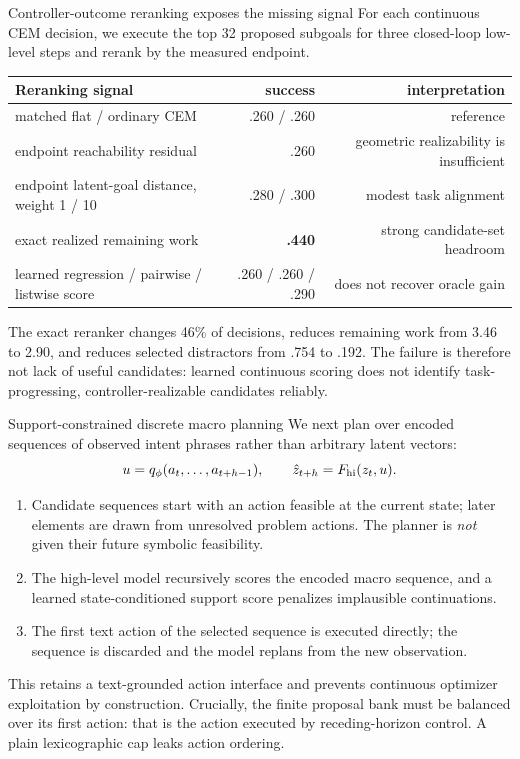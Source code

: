 \documentclass[aspectratio=169,10pt]{beamer}
\newcommand{\good}[1]{\textcolor{cgreen}{\textbf{#1}}}
\begin{document}
\begin{frame}{Controller-outcome reranking exposes the missing signal}
\footnotesize
For each continuous CEM decision, we execute the top 32 proposed subgoals for
three closed-loop low-level steps and rerank by the measured endpoint.

\medskip
\centering
\begin{tabular}{lrr}
\toprule
Reranking signal & success & interpretation\\
\midrule
matched flat / ordinary CEM & .260 / .260 & reference\\
endpoint reachability residual & .260 & geometric realizability is insufficient\\
endpoint latent-goal distance, weight 1 / 10 & .280 / .300 & modest task alignment\\
exact realized remaining work & \good{.440} & strong candidate-set headroom\\
\midrule
learned regression / pairwise / listwise score & .260 / .260 / .290 & does not recover oracle gain\\
\bottomrule
\end{tabular}

\medskip
The exact reranker changes 46\% of decisions, reduces remaining work from
3.46 to 2.90, and reduces selected distractors from .754 to .192. The failure
is therefore not lack of useful candidates: learned continuous scoring does
not identify task-progressing, controller-realizable candidates reliably.
\end{frame}

\begin{frame}{Support-constrained discrete macro planning}
\small
We next plan over encoded sequences of observed intent phrases rather than
arbitrary latent vectors:
\[
u=q_\phi(a_t,\ldots,a_{t+h-1}),\qquad
\hat z_{t+h}=F_{\rm hi}(z_t,u).
\]

\begin{enumerate}\itemsep3pt
\item Candidate sequences start with an action feasible at the current state;
later elements are drawn from unresolved problem actions. The planner is
\emph{not} given their future symbolic feasibility.
\item The high-level model recursively scores the encoded macro sequence, and
a learned state-conditioned support score penalizes implausible continuations.
\item The first text action of the selected sequence is executed directly;
the sequence is discarded and the model replans from the new observation.
\end{enumerate}

This retains a text-grounded action interface and prevents continuous
optimizer exploitation by construction. Crucially, the finite proposal bank
must be balanced over its first action: that is the action executed by
receding-horizon control. A plain lexicographic cap leaks action ordering.
\end{frame}
\end{document}
